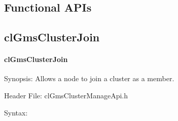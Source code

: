 \begin{flushleft}
\section{Functional APIs}
\subsection{clGmsClusterJoin}
\hypertarget{pagegms201}{}\paragraph{cl\-Gms\-Cluster\-Join}\label{pagegms201}
\begin{Desc}
\item[Synopsis:]Allows a node to join a cluster as a member.\end{Desc}
\begin{Desc}
\item[Header File:]clGmsClusterManageApi.h\end{Desc}
\begin{Desc}
\item[Syntax:]


\end{Desc}
\end{flushleft}
